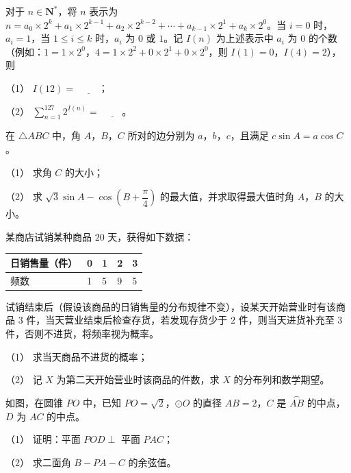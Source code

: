 \begin{question}
对于 $n\in\mathbf N^*$，将 $n$ 表示为 $n=a_0\times2^k+a_1\times2^{k-1}+a_2\times2^{k-2}+\cdots+a_{k-1}\times2^1+a_k\times2^0$。当 $i=0$ 时，$a_i=1$，当 $1\leqslant i\leqslant k$ 时，$a_i$ 为 $0$ 或 $1$。记 $I(n)$ 为上述表示中 $a_i$ 为 $0$ 的个数（例如：$1=1\times2^0$，$4=1\times2^2+0\times2^1+0\times2^0$，则 $I(1)=0$，$I(4)=2$），则

（1） $I(12)=$ $\underline{\qquad}$；

（2） $\sum\limits_{n=1}^{127}2^{I(n)}=$ $\underline{\qquad}$。

\end{question}

\begin{question}
在 $\triangle ABC$ 中，角 $A$，$B$，$C$ 所对的边分别为 $a$，$b$，$c$，且满足 $c\sin A=a\cos C$。

（1） 求角 $C$ 的大小；

（2） 求 $\sqrt3\sin A-\cos\left(B+\dfrac\pi4\right)$ 的最大值，并求取得最大值时角 $A$，$B$ 的大小。

\end{question}
\begin{question}
某商店试销某种商品 $20$ 天，获得如下数据：

\begin{center}
\begin{tabular}{lllll}
\toprule
日销售量（件） & 0 & 1 & 2 & 3 \\
\midrule
频数 & 1 & 5 & 9 & 5 \\
\bottomrule
\end{tabular}
\end{center}

试销结束后（假设该商品的日销售量的分布规律不变），设某天开始营业时有该商品 $3$ 件，当天营业结束后检查存货，若发现存货少于 $2$ 件，则当天进货补充至 $3$ 件，否则不进货，将频率视为概率。

（1） 求当天商品不进货的概率；

（2） 记 $X$ 为第二天开始营业时该商品的件数，求 $X$ 的分布列和数学期望。

\Needspace{0.4\textheight}
\end{question}
\begin{question}
如图，在圆锥 $PO$ 中，已知 $PO=\sqrt2$，$\odot O$ 的直径 $AB=2$，$C$ 是 $\overset{\frown}{AB}$ 的中点，$D$ 为 $AC$ 的中点。

（1） 证明：平面 $POD\perp$ 平面 $PAC$；

（2） 求二面角 $B-PA-C$ 的余弦值。
\nopagebreak[4]
\begin{center}\end{center}
\nopagebreak[4]
\Needspace{0.4\textheight}
\end{question}
